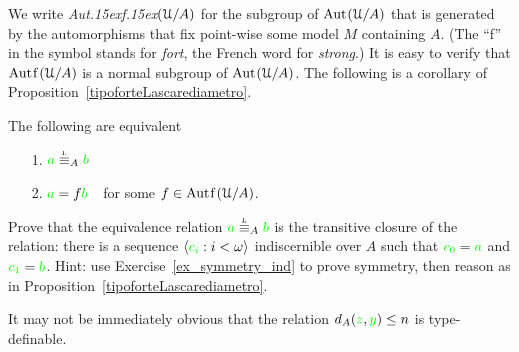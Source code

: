\documentclass[creche.tex]{subfiles}
\begin{document}
We write \emph{Aut\kern.15ex{f}\kern.15ex$(\EuScript U/A)$\/} for the subgroup of ${\rm Aut\kern.15ex}(\EuScript U/A)$ that is generated by the automorphisms that fix point-wise some model $M$ containing $A$. (The ``f'' in the symbol stands for \textit{fort\/}, the French word for \textit{strong}.) It is easy to verify that $\mathord{\rm Aut\kern.15ex{f}\kern.15ex}(\EuScript U/A)$ is a normal subgroup of ${\rm Aut\kern.15ex}(\EuScript U/A)$. The following is a corollary of Proposition~\ref{tipoforteLascarediametro}. 

\begin{corollary}
The following are equivalent
\begin{itemize}
 \item[1.] ${\gr a}\equivL_A{\gr b}$
 \item[2.] ${\color{green} a}=f{\color{green} b}$\ \ for some $f\in\mathord{\rm Aut\kern.15ex{f}\kern.15ex}(\EuScript U/A)$.\QED
\end{itemize}
\end{corollary}

% 


\begin{exercise}\label{ex_Lstp_indiscernibles}
  Prove that the equivalence relation ${\gr a}\stackrel{\smash{\scalebox{.5}{\rm L}}}{\equiv}_A{\gr b}$ is the transitive closure of the relation: there is a sequence $\langle{\color{green}c_i}:i<\omega\rangle$ indiscernible over $A$ such that ${\color{green} c_0}={\color{green} a}$ and ${\color{green} c_1}={\color{green} b}$. Hint: use Exercise~\ref{ex_symmetry_ind} to prove symmetry, then reason as in Proposition~\ref{tipoforteLascarediametro}.\QED
\end{exercise}

It may not be immediately obvious that the relation $d_A({\color{green} z},{\color{green} y})\le n$ is type-definable. 
\end{document}
